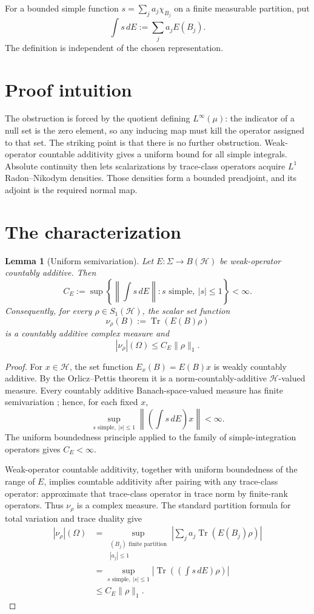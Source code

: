 \documentclass[11pt]{article}
\newtheorem{lemma}{Lemma}
\newcommand{\BH}{B(\mathcal H)}
\newcommand{\Sone}{S_1(\mathcal H)}
\begin{document}
For a bounded simple function $s=\sum_j a_j\chi_{B_j}$ on a finite measurable
partition, put
\[
 \int s\,dE:=\sum_j a_j E(B_j).
\]
The definition is independent of the chosen representation.

\section{Proof intuition}

The obstruction is forced by the quotient defining $L^\infty(\mu)$: the
indicator of a null set is the zero element, so any inducing map must kill the
operator assigned to that set.  The striking point is that there is no further
obstruction.  Weak-operator countable additivity gives a uniform bound for all
simple integrals.  Absolute continuity then lets scalarizations by trace-class
operators acquire $L^1$ Radon--Nikodym densities.  Those densities form a
bounded preadjoint, and its adjoint is the required normal map.

\section{The characterization}

\begin{lemma}[Uniform semivariation]\label{lem:semi}
Let $E:\Sigma\to\BH$ be weak-operator countably additive.  Then
\[
 C_E:=\sup\left\{\left\|\int s\,dE\right\|:
 s\text{ simple},\ |s|\leq 1\right\}<\infty.
\]
Consequently, for every $\rho\in\Sone$, the scalar set function
\[
 \nu_\rho(B):=\operatorname{Tr}(E(B)\rho)
\]
is a countably additive complex measure and
\[
 |\nu_\rho|(\Omega)\leq C_E\|\rho\|_1.
\]
\end{lemma}

\begin{proof}
For $x\in\mathcal H$, the set function $E_x(B)=E(B)x$ is weakly countably
additive.  By the Orlicz--Pettis theorem it is a norm-countably-additive
$\mathcal H$-valued measure.  Every countably additive Banach-space-valued
measure has finite semivariation \cite[Chapter I]{DU}; hence, for each fixed
$x$,
\[
 \sup_{s\text{ simple},\ |s|\leq1}
 \left\|\left(\int s\,dE\right)x\right\|<\infty.
\]
The uniform boundedness principle applied to the family of simple-integration
operators gives $C_E<\infty$.

Weak-operator countable additivity, together with uniform boundedness of the
range of $E$, implies countable additivity after pairing with any trace-class
operator: approximate that trace-class operator in trace norm by finite-rank
operators.  Thus $\nu_\rho$ is a complex measure.  The standard partition
formula for total variation and trace duality give
\begin{align*}
 |\nu_\rho|(\Omega)
 &=\sup_{\substack{(B_j)\text{ finite partition}\\ |a_j|\leq1}}
 \left|\sum_j a_j\operatorname{Tr}(E(B_j)\rho)\right|\\
 &=\sup_{s\text{ simple},\ |s|\leq1}
 \left|\operatorname{Tr}\left(\left(\int s\,dE\right)\rho\right)\right|\\
 &\leq C_E\|\rho\|_1.
\end{align*}
\end{proof}
\end{document}
